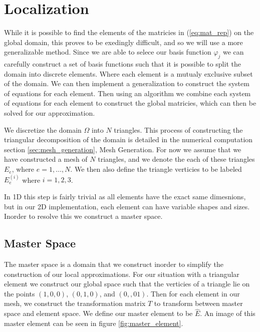 \documentclass[../fem.tex]{subfiles}
\begin{document}
\section{Localization}%
\label{sec:localization}

While it is possible to find the elements of the matricies in
(\ref{eq:mat_rep}) on the global domain, this proves to be exedingly difficult,
and so we will use a more generalizable method. Since we are able to selece our
basis function $\varphi_j$ we can carefully construct a set of basis functions
such that it is possible to split the domain into discrete elements. Where each
element is a mutualy exclusive subset of the domain. We can then implement a
generalization to construct the system of equations for each element. Then
using an algorithm we combine each system of equations for each element to
construct the global matricies, which can then be solved for our approximation.

We discretize the domain $\Omega$ into $N$ triangles. This process of
constructing the triangular decomposition of the domain is detailed in the
numerical computation section \ref{sec:mesh_generation},  Mesh Generation. For
now we assume that we have constructed a mesh of $N$ triangles, and we denote
the each of these triangles $E_e$, where $e=1,\ldots,N$. We then also define
the triangle verticies to be labeled $E_e^{(i)}$ where $i=1,2,3$.

In 1D this step is fairly trivial as all elements have the exact same
dimesnions, but in our 2D implementation, each element can have variable shapes
and sizes. Inorder to resolve this we construct a master space.

\subsection{Master Space}%
\label{sub:master_space}

The master space is a domain that we construct inorder to simplify the
construction of our local approximations. For our situation with a triangular
element we construct our global space such that the verticies of a triangle lie
on the points $(1,0,0)$, $(0,1,0)$, and $(0,,01)$. Then for each element in our
mesh, we construct the transformation matrix $T$ to transform between master
space and element space. We define our master element to be $\hat{E}$. An image
of this master element can be seen in figure \ref{fig:master_element}.
\end{document}
